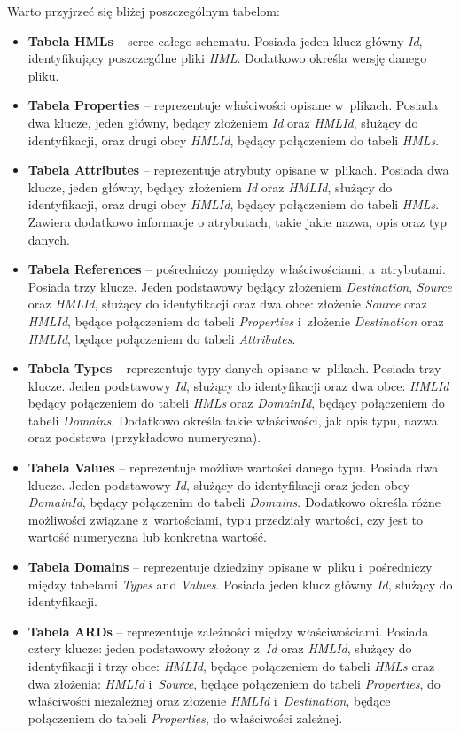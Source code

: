 Warto przyjrzeć się bliżej poszczególnym tabelom:
\begin{itemize}
    \item \textbf{Tabela HMLs} -- serce całego schematu. Posiada jeden klucz główny \emph{Id}, identyfikujący poszczególne pliki \emph{HML}. Dodatkowo określa wersję danego pliku.
    \item \textbf{Tabela Properties} -- reprezentuje właściwości opisane w~plikach. Posiada dwa klucze, jeden główny, będący złożeniem \emph{Id} oraz \emph{HMLId}, służący do identyfikacji, oraz drugi obcy \emph{HMLId}, będący połączeniem do tabeli \emph{HMLs}.
    \item \textbf{Tabela Attributes} -- reprezentuje atrybuty opisane w~plikach. Posiada dwa klucze, jeden główny, będący złożeniem \emph{Id} oraz \emph{HMLId}, służący do identyfikacji, oraz drugi obcy \emph{HMLId}, będący połączeniem do tabeli \emph{HMLs}. Zawiera dodatkowo informacje o atrybutach, takie jakie nazwa, opis oraz typ danych.
    \item \textbf{Tabela References} -- pośredniczy pomiędzy właściwościami, a~atrybutami. Posiada trzy klucze. Jeden podstawowy będący złożeniem \emph{Destination}, \emph{Source} oraz \emph{HMLId}, służący do identyfikacji oraz dwa obce: złożenie \emph{Source} oraz \emph{HMLId}, będące połączeniem do tabeli \emph{Properties} i~złożenie \emph{Destination} oraz \emph{HMLId}, będące połączeniem do tabeli \emph{Attributes}.
    \item \textbf{Tabela Types} -- reprezentuje typy danych opisane w~plikach. Posiada trzy klucze. Jeden podstawowy \emph{Id}, służący do identyfikacji oraz dwa obce: \emph{HMLId} będący połączeniem do tabeli \emph{HMLs} oraz \emph{DomainId}, będący połączeniem do tabeli \emph{Domains}. Dodatkowo określa takie właściwości, jak opis typu, nazwa oraz podstawa (przykładowo numeryczna).
    \item \textbf{Tabela Values} -- reprezentuje możliwe wartości danego typu. Posiada dwa klucze. Jeden podstawowy \emph{Id}, służący do identyfikacji oraz jeden obcy \emph{DomainId}, będący połączenim do tabeli \emph{Domains}. Dodatkowo określa różne możliwości związane z~wartościami, typu przedziały wartości, czy jest to wartość numeryczna lub konkretna wartość.
    \item \textbf{Tabela Domains} -- reprezentuje dziedziny opisane w~pliku i~pośredniczy między tabelami \emph{Types} and \emph{Values}. Posiada jeden klucz główny \emph{Id}, służący do identyfikacji.
    \item \textbf{Tabela ARDs} -- reprezentuje zależności między właściwościami. Posiada cztery klucze: jeden podstawowy złożony z~\emph{Id} oraz \emph{HMLId}, służący do identyfikacji i trzy obce: \emph{HMLId}, będące połączeniem do tabeli \emph{HMLs} oraz dwa złożenia: \emph{HMLId} i~\emph{Source}, będące połączeniem do tabeli \emph{Properties}, do właściwości niezależnej oraz złożenie \emph{HMLId} i~\emph{Destination}, będące połączeniem do tabeli \emph{Properties}, do właściwości zależnej.

\end{itemize}
